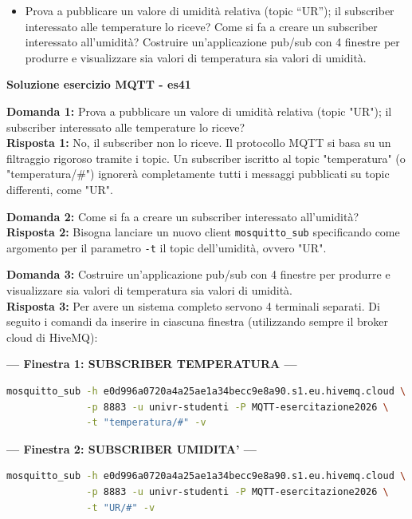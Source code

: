 \documentclass[11pt]{article}
\begin{document}
\begin{tcolorbox}[colback=blue!5!white,colframe=blue!75!black,title=\textbf{DOMANDA}, breakable]
\begin{itemize}
    \item Prova a pubblicare un valore di umidità relativa (topic ``UR''); il subscriber interessato alle temperature lo riceve? Come si fa a creare un subscriber interessato all'umidità? Costruire un'applicazione pub/sub con 4 finestre per produrre e visualizzare sia valori di temperatura sia valori di umidità.
\end{itemize}
\end{tcolorbox}

\begin{tcolorbox}[colback=green!5!white,colframe=green!75!black,title=\textbf{RISPOSTA}, breakable]
\textbf{Soluzione esercizio MQTT - es41}

\textbf{Domanda 1:} Prova a pubblicare un valore di umidità relativa (topic "UR"); il subscriber interessato alle temperature lo riceve?\\
\textbf{Risposta 1:} No, il subscriber non lo riceve. Il protocollo MQTT si basa su un filtraggio rigoroso tramite i topic. Un subscriber iscritto al topic "temperatura" (o "temperatura/\#") ignorerà completamente tutti i messaggi pubblicati su topic differenti, come "UR".

\textbf{Domanda 2:} Come si fa a creare un subscriber interessato all'umidità?\\
\textbf{Risposta 2:} Bisogna lanciare un nuovo client \texttt{mosquitto\_sub} specificando come argomento per il parametro \texttt{-t} il topic dell'umidità, ovvero "UR".

\textbf{Domanda 3:} Costruire un'applicazione pub/sub con 4 finestre per produrre e visualizzare sia valori di temperatura sia valori di umidità.\\
\textbf{Risposta 3:} Per avere un sistema completo servono 4 terminali separati. Di seguito i comandi da inserire in ciascuna finestra (utilizzando sempre il broker cloud di HiveMQ):

\textbf{--- Finestra 1: SUBSCRIBER TEMPERATURA ---}
\begin{lstlisting}[language=bash, basicstyle=\ttfamily\small]
mosquitto_sub -h e0d996a0720a4a25ae1a34becc9e8a90.s1.eu.hivemq.cloud \
              -p 8883 -u univr-studenti -P MQTT-esercitazione2026 \
              -t "temperatura/#" -v
\end{lstlisting}

\textbf{--- Finestra 2: SUBSCRIBER UMIDITA' ---}
\begin{lstlisting}[language=bash, basicstyle=\ttfamily\small]
mosquitto_sub -h e0d996a0720a4a25ae1a34becc9e8a90.s1.eu.hivemq.cloud \
              -p 8883 -u univr-studenti -P MQTT-esercitazione2026 \
              -t "UR/#" -v
\end{lstlisting}


\end{tcolorbox}
\end{document}

